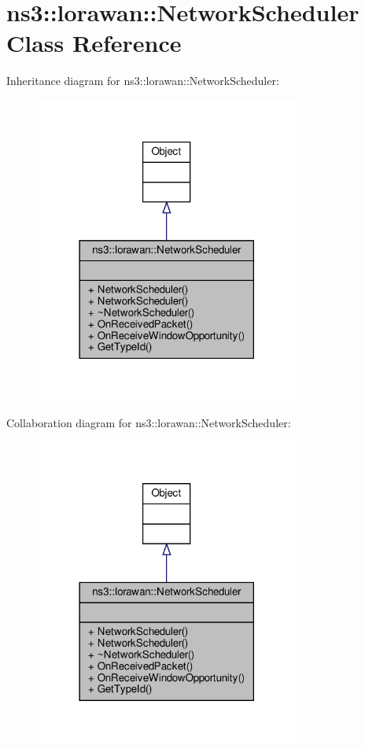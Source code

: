 \hypertarget{classns3_1_1lorawan_1_1NetworkScheduler}{}\section{ns3\+:\+:lorawan\+:\+:Network\+Scheduler Class Reference}
\label{classns3_1_1lorawan_1_1NetworkScheduler}


Inheritance diagram for ns3\+:\+:lorawan\+:\+:Network\+Scheduler\+:
\nopagebreak
\begin{figure}[H]
\begin{center}
\leavevmode
\includegraphics[width=246pt]{classns3_1_1lorawan_1_1NetworkScheduler__inherit__graph}
\end{center}
\end{figure}


Collaboration diagram for ns3\+:\+:lorawan\+:\+:Network\+Scheduler\+:
\nopagebreak
\begin{figure}[H]
\begin{center}
\leavevmode
\includegraphics[width=246pt]{classns3_1_1lorawan_1_1NetworkScheduler__coll__graph}
\end{center}
\end{figure}

